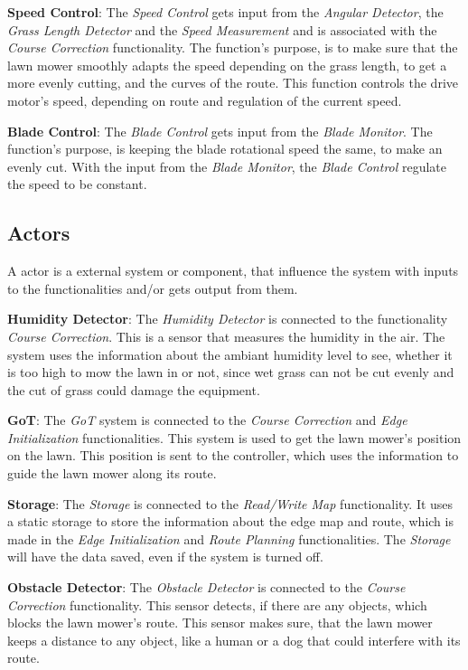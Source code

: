 \textbf{Speed Control}:
The \textit{Speed Control} gets input from the \textit{Angular Detector}, the \textit{Grass Length Detector} and the \textit{Speed Measurement} and is associated with the \textit{Course Correction} functionality. The function's purpose, is to make sure that the lawn mower smoothly adapts the speed depending on the grass length, to get a more evenly cutting, and the curves of the route. This function controls the drive motor's speed, depending on route and regulation of the current speed.

\textbf{Blade Control}:
The \textit{Blade Control} gets input from the \textit{Blade Monitor}. The function's purpose, is keeping the blade rotational speed the same, to make an evenly cut. With the input from the \textit{Blade Monitor}, the \textit{Blade Control} regulate the speed to be constant.

\subsection{Actors}

A actor is a external system or component, that influence the system with inputs to the functionalities and/or gets output from them.

\textbf{Humidity Detector}:
The \textit{Humidity Detector} is connected to the functionality \textit{Course Correction}. This is a sensor that measures the humidity in the air. The system uses the information about the ambiant humidity level to see, whether it is too high to mow the lawn in or not, since wet grass can not be cut evenly and the cut of grass could damage the equipment. 

\textbf{GoT}:
The \textit{GoT} system is connected to the \textit{Course Correction} and \textit{Edge Initialization} functionalities. This system is used to get the lawn mower's position on the lawn. This position is sent to the controller, which uses the information to guide the lawn mower along its route.

\textbf{Storage}:
The \textit{Storage} is connected to the \textit{Read/Write Map} functionality. It uses a static storage to store the information about the edge map and route, which is made in the \textit{Edge Initialization} and \textit{Route Planning} functionalities. The \textit{Storage} will have the data saved, even if the system is turned off.

\textbf{Obstacle Detector}:
The \textit{Obstacle Detector} is connected to the \textit{Course Correction} functionality. This sensor detects, if there are any objects, which blocks the lawn mower's route. This sensor makes sure, that the lawn mower keeps a distance to any object, like a human or a dog that could interfere with its route.

